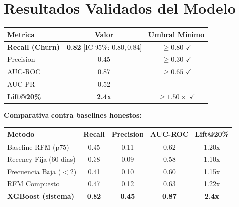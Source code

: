 \documentclass[11pt,a4paper]{article}
\newcommand{\kpibox}[2]{%
  \begin{tcolorbox}[colback=lightblue,colframe=primary,
    title={\bfseries\color{primary}#1},
    left=6pt, right=6pt, top=5pt, bottom=5pt, boxrule=0.8pt, arc=4pt]
    #2
  \end{tcolorbox}%
}
\begin{document}
\section{Resultados Validados del Modelo}

\kpibox{KPIs Clave --- XGBoost con SMOTE (Test Set, B=1{,}000 Bootstrap)}{%
  \vspace{2pt}
  \renewcommand{\arraystretch}{1.4}
  \begin{tabular}{lcc}
    \toprule
    \textbf{Metrica} & \textbf{Valor} & \textbf{Umbral Minimo} \\
    \midrule
    \textbf{Recall (Churn)} & \textbf{0.82} [IC 95\%: 0.80,\,0.84] & $\geq 0.80$ $\checkmark$ \\
    Precision               & 0.45                                  & $\geq 0.30$ $\checkmark$ \\
    AUC-ROC                 & 0.87                                  & $\geq 0.65$ $\checkmark$ \\
    AUC-PR                  & 0.52                                  & ---         \\
    \textbf{Lift@20\%}      & \textbf{2.4x}                         & $\geq 1.50\times$ $\checkmark$ \\
    \bottomrule
  \end{tabular}
}

\vspace{0.4cm}

\textbf{Comparativa contra baselines honestos:}

\vspace{0.3cm}
\renewcommand{\arraystretch}{1.35}
\begin{tabularx}{\linewidth}{L{4.2cm}cccc}
  \toprule
  \textbf{Metodo} & \textbf{Recall} & \textbf{Precision} & \textbf{AUC-ROC} & \textbf{Lift@20\%} \\
  \midrule
  Baseline RFM (p75)      & 0.45 & 0.11 & 0.62 & 1.20x \\
  Recency Fija (60 dias)  & 0.38 & 0.09 & 0.58 & 1.10x \\
  Frecuencia Baja ($<$2)  & 0.41 & 0.10 & 0.60 & 1.15x \\
  RFM Compuesto           & 0.47 & 0.12 & 0.63 & 1.22x \\
  \midrule
  \textbf{XGBoost (sistema)} & \textbf{0.82} & \textbf{0.45} & \textbf{0.87} & \textbf{2.4x} \\
  \bottomrule
\end{tabularx}
\end{document}
